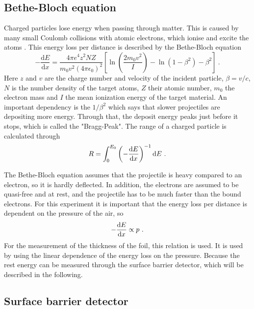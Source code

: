 \subsection{Bethe-Bloch equation}

Charged particles lose energy when passing through matter. 
This is caused by many small Coulomb collisions with atomic electrons, which ionise and excite the atoms \cite{leo}.
This energy loss per distance is described by the Bethe-Bloch equation 
\begin{equation}
    -\frac{\text{d}E}{\text{d}x} = \frac{4 \pi e^4 z^2 N Z}{m_0 v^2 \left(4 \pi \epsilon_0\right)^2}
    \left[ \ln\left(\frac{2 m_0 v^2}{I}\right) - \ln\left(1 - \beta^2\right) - \beta^2 \right] \ .
    \label{eq:bethe}
\end{equation}
Here $z$ and $v$ are the charge number and velocity of the incident particle, $\beta = v/c$,
$N$ is the number density of the target atoms, $Z$ their atomic number, $m_0$ the electron mass
and $I$ the mean ionization energy of the target material.
An important dependency is the $1/\beta^2$ which says that slower projectiles are depositing more energy. 
Through that, the deposit energy peaks just before it stops, which is called the "Bragg-Peak". 
The range of a charged particle is calculated through
\begin{equation}
    R = \int_0^{E_0}\left(- \frac{\text d E}{\text d x }\right)^{-1}\text d E \ .
\end{equation}

The Bethe-Bloch equation assumes that the projectile is heavy compared to an electron, so it is hardly deflected.
In addition, the electrons are assumed to be quasi-free and at rest, and the projectile has to be much faster than the bound electrons.
For this experiment it is important that the energy loss per distance is dependent on the pressure of the air, so 
\begin{equation}
    -\frac{\text{d}E}{\text d x} \propto p \ .
\end{equation}
For the measurement of the thickness of the foil, this relation is used. 
It is used by using the linear dependence of the energy loss on the pressure. 
Because the rest energy can be measured through the surface barrier detector, which will be described in the following.


\subsection{Surface barrier detector}

